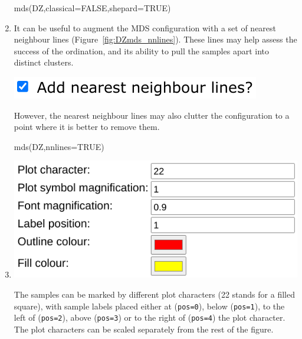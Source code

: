 \begin{refsection}
\begin{enumerate}
\begin{console}
mds(DZ,classical=FALSE,shepard=TRUE)
\end{console}

\item It can be useful to augment the MDS configuration with a set of
  nearest neighbour lines (Figure~\ref{fig:DZmds_nnlines}). These
  lines may help assess the success of the ordination, and its ability
  to pull the samples apart into distinct clusters.
  
\noindent\begin{minipage}[t]{.32\linewidth}
\strut\vspace*{-\baselineskip}\newline
\includegraphics[width=\linewidth]{../figures/detritalMDSnnlines.png}
\end{minipage}
\begin{minipage}[t]{.68\linewidth}
  However, the nearest neighbour lines may also clutter the
  configuration to a point where it is better to remove them.
\end{minipage}

\begin{console}
mds(DZ,nnlines=TRUE)
\end{console}

\item\noindent\begin{minipage}[t]{.5\linewidth}
\strut\vspace*{-\baselineskip}\newline
\includegraphics[width=\linewidth]{../figures/detritalMDSotheroptions.png}
\end{minipage}
\begin{minipage}[t]{.5\linewidth}
  The samples can be marked by different plot characters (22 stands
  for a filled square), with sample labels placed either at
  (\texttt{pos=0}), below (\texttt{pos=1}), to the left of
  (\texttt{pos=2}), above (\texttt{pos=3}) or to the right of
  (\texttt{pos=4}) the plot character. The plot characters can be
  scaled separately from the rest of the figure.
\end{minipage}


\end{enumerate}
\end{refsection}
